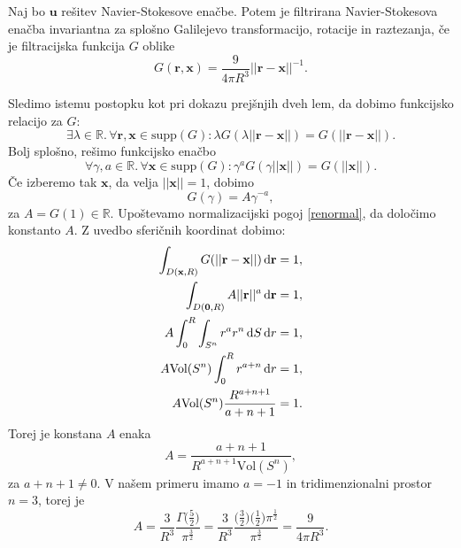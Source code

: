 \documentclass[mat2, tisk]{fmfdelo}
\newcommand{\R}{\mathbb R}
\newcommand{\bd}{\textbf}
\begin{document}
\begin{lema}
Naj bo $\bd{u}$ rešitev Navier-Stokesove enačbe. Potem je filtrirana Navier-Stokesova enačba 
invariantna za splošno Galilejevo transformacijo, rotacije in raztezanja, če je filtracijska funkcija $G$ oblike
$$
G(\bd{r}, \bd{x}) = \frac{9}{4\pi R^3}||\bd{r} - \bd{x}||^{-1}.
$$
\end{lema}

\begin{dokaz}
Sledimo istemu postopku kot pri dokazu prejšnjih dveh lem, da dobimo funkcijsko relacijo za $G$:
$$
\exists \lambda \in \R.\, \forall\bd{r}, \bd{x}\in \text{supp}(G): \lambda G(\lambda||\bd{r} - \bd{x}||) = G(||\bd{r} - \bd{x}||).
$$
Bolj splošno, rešimo funkcijsko enačbo
$$
\forall \gamma, a \in \R.\, \forall \bd{x}\in \text{supp}(G): \gamma^a G(\gamma ||\bd{x}||) = G(||\bd{x}||).
$$
Če izberemo tak $\bd{x}$, da velja $||\bd{x}|| = 1$, dobimo
$$
G(\gamma) = A\gamma^{-a},
$$
za $A = G(1) \in \R$. Upoštevamo normalizacijski pogoj \eqref{renormal}, da določimo konstanto $A$.
Z uvedbo sferičnih koordinat dobimo:
\begin{align*}
\int_{D(\bd{x}, R)} G(||\bd{r} -\bd{x}||) \dif \bd{r} &= 1, \\
\int_{D(\bd{0}, R)} A||\bd{r}||^a \dif \bd{r} &= 1, \\
A \int_{0}^{R} \int_{S^{n}} r^{a} r^{n} \dif S \dif r &= 1, \\
A \text{Vol}(S^{n})\int_{0}^{R} r^{a + n} \dif r &= 1, \\
A \text{Vol}(S^{n}) \frac{R^{a + n + 1}}{a + n + 1} &= 1.
\end{align*}
Torej je konstana $A$ enaka
$$
A = \frac{a + n + 1}{R^{a+n+1}\text{Vol}(S^{n})},
$$ 
za $a + n + 1\neq 0$.
V našem primeru imamo $a = -1$ in tridimenzionalni prostor $n = 3$, torej je 
$$
A = \frac{3}{R^3} \frac{\Gamma\big(\frac{5}{2}\big)}{\pi^\frac{3}{2}} = \frac{3}{R^3} \frac{\big(\frac{3}{2}\big) \big(\frac{1}{2}\big)\pi^\frac{1}{2}}{\pi^\frac{3}{2}} = \frac{9}{4\pi R^3}.
$$


\end{dokaz}
\end{document}
